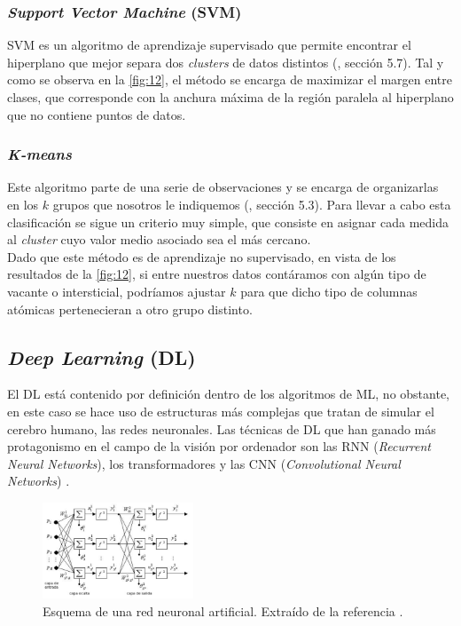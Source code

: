 \subsubsection{\textit{Support Vector Machine} (SVM)}
SVM es un algoritmo de aprendizaje supervisado que permite encontrar el hiperplano que mejor separa dos \textit{clusters} de datos distintos (\cite{databook}, sección 5.7). Tal y como se observa en la \autoref{fig:12}, el método se encarga de maximizar el margen entre clases, que corresponde con la anchura máxima de la región paralela al hiperplano que no contiene puntos de datos.

\subsubsection{\textit{K-means}}
Este algoritmo parte de una serie de observaciones y se encarga de organizarlas en los $k$ grupos que nosotros le indiquemos (\cite{databook}, sección 5.3). Para llevar a cabo esta clasificación se sigue un criterio muy simple, que consiste en asignar cada medida al \textit{cluster} cuyo valor medio asociado sea el más cercano.\\

Dado que este método es de aprendizaje no supervisado, en vista de los resultados de la \autoref{fig:12}, si entre nuestros datos contáramos con algún tipo de vacante o intersticial, podríamos ajustar $k$ para que dicho tipo de columnas atómicas pertenecieran a otro grupo distinto.

\subsection{\textit{Deep Learning} (DL)}
El DL está contenido por definición dentro de los algoritmos de ML, no obstante, en este caso se hace uso de estructuras más complejas que tratan de simular el cerebro humano, las redes neuronales. Las técnicas de DL que han ganado más protagonismo en el campo de la visión por ordenador son las RNN (\textit{Recurrent Neural Networks}), los transformadores y las CNN (\textit{Convolutional Neural Networks}) \cite{CNN} \cite{ml}.\\

\begin{figure}
    \includegraphics[width=0.40\textwidth]{fig/Fig13.png}
    \caption{Esquema de una red neuronal artificial. Extraído de la referencia \cite{red}.}
    \label{fig:13}
\end{figure} 

